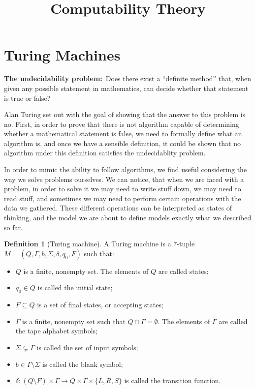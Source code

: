 \documentclass[11pt,a4paper]{article}
\title{\textbf{Computability Theory}}
\author{}
\date{}
\theoremstyle{definition}
\newtheorem{definition}{Definition}[section]
\theoremstyle{plain}
\begin{document}
	\maketitle
	\newpage
  \section{Turing Machines}
  \textbf{The undecidability problem:}\
  Does there exist a ``definite method'' that, 
  when given any possible statement in mathematics, 
  can decide whether that statement is true or false?

  Alan Turing set out with the goal of showing that the answer to this
  problem is no.
  First, in order to prove that there is not algorithm capable of determining
  whether a mathematical statement is false, we need to formally define
  what an algorithm is, and once we have a sensible definition, it could
  be shown that no algorithm under this definition satisfies the
  undecidablity problem.

  In order to mimic the ability to follow algorithms, we find useful
  considering the way we solve problems ourselves.
  We can notice, that when we are faced with a problem, in order to solve
  it we may need to write stuff down, we may need to read stuff, and
  sometimes we may need to perform certain operations with the data
  we gathered. These different operations can be interpreted as states
  of thinking, and the model we are about to define models exactly what
  we described so far.

  \begin{definition}[Turing machine]
    A Turing machine is a $7$-tuple 
    $M = (Q,\Gamma,b,\Sigma,\delta,q_{0},F)$
    such that:
    \begin{itemize}
      \item $Q$ is a finite, nonempty set.
        The elements of $Q$ are called states;
      \item $q_0 \in Q$ is called the initial state;
      \item $F \subseteq Q$ is a set of final states, or accepting states;
      \item $\Gamma$ is a finite, nonempty set such that 
        $Q \cap \Gamma = \emptyset$. The elements of $\Gamma$ are called
        the tape alphabet symbols;
      \item $\Sigma \subsetneq \Gamma$ is called the set of input symbols;
      \item $b \in \Gamma \setminus \Sigma$ is called the blank symbol;
      \item $\delta \colon (Q \setminus F) \times \Gamma \to 
        Q \times \Gamma \times \{L, R, S\}$ is called the transition 
        function.
      \end{itemize}
  \end{definition}
\end{document}
